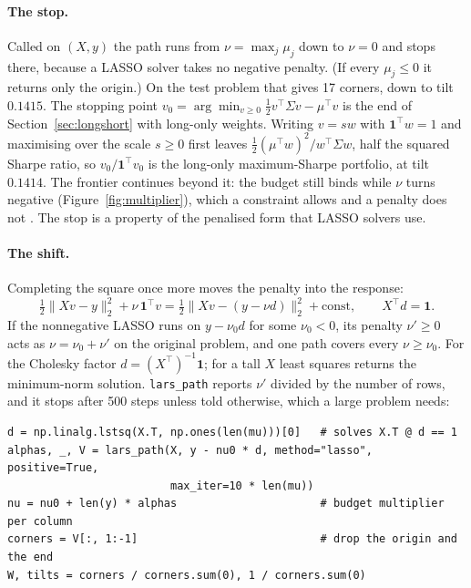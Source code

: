 \documentclass[11pt]{article}
\newcommand{\trans}{^{\top}}
\newcommand{\Sig}{\Sigma}
\begin{document}
\paragraph{The stop.} Called on $(X,y)$ the path runs from $\nu=\max_j\mu_j$ down to
$\nu=0$ and stops there, because a LASSO solver takes no negative penalty. (If every
$\mu_j\le0$ it returns only the origin.) On the test problem that gives 17 corners, down
to tilt $0.1415$. The stopping point
$v_0=\arg\min_{v\ge0}\frac12v\trans\Sig v-\mu\trans v$ is the end of
Section~\ref{sec:longshort} with long-only weights. Writing $v=sw$ with
$\mathbf 1\trans w=1$ and maximising over the scale $s\ge0$ first leaves
$\frac12(\mu\trans w)^2/w\trans\Sig w$, half the squared Sharpe ratio, so
$v_0/\mathbf 1\trans v_0$ is the long-only maximum-Sharpe portfolio, at tilt $0.1414$.
The frontier continues beyond it: the budget still binds while $\nu$ turns negative
(Figure~\ref{fig:multiplier}), which a constraint allows and a penalty does not
\cite[\S3.4]{perspective}. The stop is a property of the penalised form that LASSO
solvers use.

\paragraph{The shift.} Completing the square once more moves the penalty into the
response:
\begin{equation}
\label{eq:shift}
\tfrac12\|Xv-y\|_2^2+\nu\,\mathbf 1\trans v
=\tfrac12\bigl\|Xv-(y-\nu d)\bigr\|_2^2+\text{const},
\qquad X\trans d=\mathbf 1 .
\end{equation}
If the nonnegative LASSO runs on $y-\nu_0d$ for some $\nu_0<0$, its penalty $\nu'\ge0$
acts as $\nu=\nu_0+\nu'$ on the original problem, and one path covers every $\nu\ge\nu_0$.
For the Cholesky factor $d=(X\trans)^{-1}\mathbf 1$; for a tall $X$ least squares returns
the minimum-norm solution. \texttt{lars\_path} reports $\nu'$ divided by the number of
rows, and it stops after 500 steps unless told otherwise, which a large problem needs:

\begin{lstlisting}
d = np.linalg.lstsq(X.T, np.ones(len(mu)))[0]   # solves X.T @ d == 1
alphas, _, V = lars_path(X, y - nu0 * d, method="lasso", positive=True,
                         max_iter=10 * len(mu))
nu = nu0 + len(y) * alphas                      # budget multiplier per column
corners = V[:, 1:-1]                            # drop the origin and the end
W, tilts = corners / corners.sum(0), 1 / corners.sum(0)
\end{lstlisting}
\end{document}
